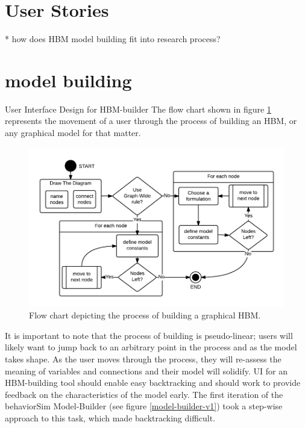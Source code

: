 \section{User Stories}
* how does HBM model building fit into research process?

\section{model building}
User Interface Design for HBM-builder 
The flow chart shown in figure \ref{HBM-build-process} represents the movement of a user through the process of building an HBM, or any graphical model for that matter.

\begin{figure}[!t]
  \centering
  \includegraphics[width=0.9\columnwidth]{img/HBM-build-process}
  \caption{Flow chart depicting the process of building a graphical HBM.}
  \label{HBM-build-process}
\end{figure}

It is important to note that the process of building is pseudo-linear; users will likely want to jump back to an arbitrary point in the process and as the model takes shape. 
As the user moves through the process, they will re-assess the meaning of variables and connections and their model will solidify. 
UI for an HBM-building tool should enable easy backtracking and should work to provide feedback on the characteristics of the model early. 
The first iteration of the behaviorSim Model-Builder (see figure \ref{model-builder-v1}) took a step-wise approach to this task, which made backtracking difficult.

